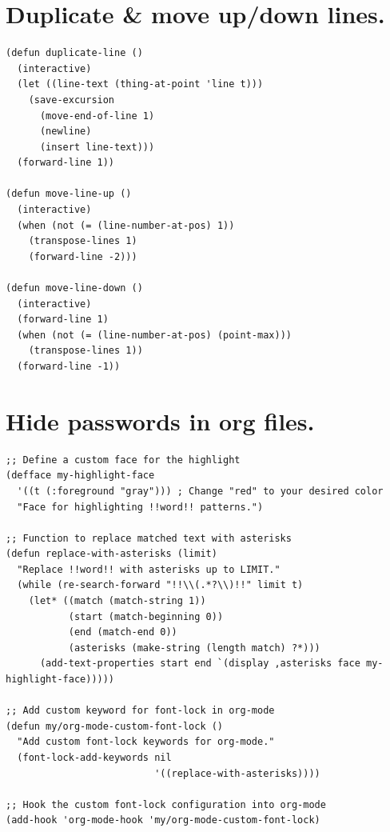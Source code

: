 \documentclass[11pt]{article}
\begin{document}
\section{Duplicate \& move up/down lines.}
\label{sec:org260b5d6}
\begin{verbatim}
(defun duplicate-line ()
  (interactive)
  (let ((line-text (thing-at-point 'line t)))
    (save-excursion
      (move-end-of-line 1)
      (newline)
      (insert line-text)))
  (forward-line 1))

(defun move-line-up ()
  (interactive)
  (when (not (= (line-number-at-pos) 1))
    (transpose-lines 1)
    (forward-line -2)))

(defun move-line-down ()
  (interactive)
  (forward-line 1)
  (when (not (= (line-number-at-pos) (point-max)))
    (transpose-lines 1))
  (forward-line -1))
\end{verbatim}
\section{Hide passwords in org files.}
\label{sec:orga0e5be5}
\begin{verbatim}
;; Define a custom face for the highlight
(defface my-highlight-face
  '((t (:foreground "gray"))) ; Change "red" to your desired color
  "Face for highlighting !!word!! patterns.")

;; Function to replace matched text with asterisks
(defun replace-with-asterisks (limit)
  "Replace !!word!! with asterisks up to LIMIT."
  (while (re-search-forward "!!\\(.*?\\)!!" limit t)
    (let* ((match (match-string 1))
           (start (match-beginning 0))
           (end (match-end 0))
           (asterisks (make-string (length match) ?*)))
      (add-text-properties start end `(display ,asterisks face my-highlight-face)))))

;; Add custom keyword for font-lock in org-mode
(defun my/org-mode-custom-font-lock ()
  "Add custom font-lock keywords for org-mode."
  (font-lock-add-keywords nil
                          '((replace-with-asterisks))))

;; Hook the custom font-lock configuration into org-mode
(add-hook 'org-mode-hook 'my/org-mode-custom-font-lock)
\end{verbatim}
\end{document}
